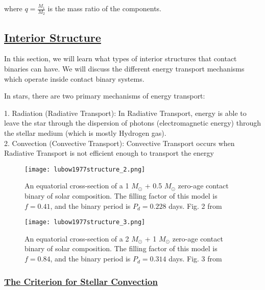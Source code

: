 \documentclass[12pt]{article} %
\numberwithin{equation}{section} %
\begin{document}
where $q = \frac{M_{1}}{M_{2}}$ is the mass ratio of the components.


\citep{gazeas2006masses}

\subsection[Interior Structure]{\hyperlink{toc}{Interior Structure}} \label{sec: Interior Structure}

In this section, we will learn what types of interior structures that contact binaries can have. We will discuss the different energy transport mechanisms which operate inside contact binary systems.

In stars, there are two primary mechanisms of energy transport:

1. Radiation (Radiative Transport): In Radiative Transport, energy is able to leave the star through the dispersion of photons (electromagnetic energy) through the stellar medium (which is mostly Hydrogen gas). \\

2. Convection (Convective Transport): Convective Transport occurs when Radiative Transport is not efficient enough to transport the energy  \\

\begin{figure}[H]
\centering
\texttt{[image: lubow1977structure\_2.png]}
\caption{An equatorial cross-section of a 1 $M_{\odot}$ + 0.5 $M_{\odot}$ zero-age contact binary of solar composition. The filling factor of this model is $f = 0.41$, and the binary period is $P_{d} = 0.228$ days. Fig. 2 from \citet{lubow1977structure}}
\label{fig: lubow1977structure_2}
\end{figure}

\begin{figure}[H]
\centering
\texttt{[image: lubow1977structure\_3.png]}
\caption{An equatorial cross-section of a 2 $M_{\odot}$ + 1 $M_{\odot}$ zero-age contact binary of solar composition. The filling factor of this model is $f = 0.84$, and the binary period is $P_{d} = 0.314$ days. Fig. 3 from \citet{lubow1977structure}}
\label{fig: lubow1977structure_3}
\end{figure}

\subsubsection[The Criterion for Stellar Convection]{\hyperlink{toc}{The Criterion for Stellar Convection}} \label{sec: The Criterion for Stellar Convection}
\end{document}
